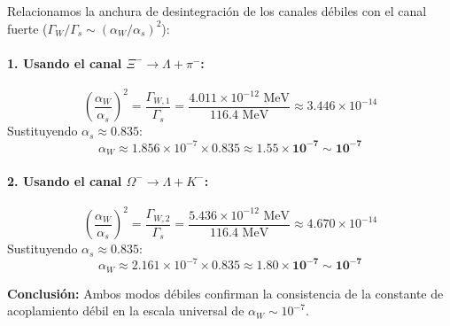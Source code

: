 \begin{problema}
Relacionamos la anchura de desintegración de los canales débiles con el canal fuerte ($\Gamma_W / \Gamma_s \sim (\alpha_W / \alpha_s)^2$):

\paragraph{1. Usando el canal $\Xi^- \to \Lambda + \pi^-$:}
\begin{equation*}
    \left( \frac{\alpha_W}{\alpha_s} \right)^2 = \frac{\Gamma_{W,1}}{\Gamma_s} = \frac{4.011 \times 10^{-12} \text{ MeV}}{116.4 \text{ MeV}} \approx 3.446 \times 10^{-14}
\end{equation*}
Sustituyendo $\alpha_s \approx 0.835$:
\begin{equation*}
    \alpha_W \approx 1.856 \times 10^{-7} \times 0.835 \approx \mathbf{1.55 \times 10^{-7} \sim 10^{-7}}
\end{equation*}

\paragraph{2. Usando el canal $\Omega^- \to \Lambda + K^-$:}
\begin{equation*}
    \left( \frac{\alpha_W}{\alpha_s} \right)^2 = \frac{\Gamma_{W,2}}{\Gamma_s} = \frac{5.436 \times 10^{-12} \text{ MeV}}{116.4 \text{ MeV}} \approx 4.670 \times 10^{-14}
\end{equation*}
Sustituyendo $\alpha_s \approx 0.835$:
\begin{equation*}
    \alpha_W \approx 2.161 \times 10^{-7} \times 0.835 \approx \mathbf{1.80 \times 10^{-7} \sim 10^{-7}}
\end{equation*}

\textbf{Conclusión:} Ambos modos débiles confirman la consistencia de la constante de acoplamiento débil en la escala universal de $\alpha_W \sim 10^{-7}$.
\end{problema}
\newpage
